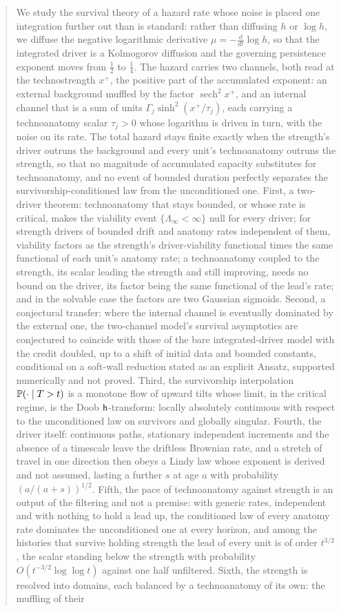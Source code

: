 \begin{abstract}
We study the survival theory of a hazard rate whose noise is placed one integration further out than is standard: rather than diffusing $h$ or $\log h$, we diffuse the negative logarithmic derivative $\mu=-\frac{d}{dt}\log h$, so that the integrated driver is a Kolmogorov diffusion and the governing persistence exponent moves from $\tfrac12$ to $\tfrac14$. The hazard carries two channels, both read at the technostrength $x^+$, the positive part of the accumulated exponent: an external background muffled by the factor $\operatorname{sech}^2x^+$, and an internal channel that is a sum of units $\Gamma_j\sinh^2(x^+/\tau_j)$, each carrying a technoanatomy scalar $\tau_j>0$ whose logarithm is driven in turn, with the noise on its rate. The total hazard stays finite exactly when the strength's driver outruns the background and every unit's technoanatomy outruns the strength, so that no magnitude of accumulated capacity substitutes for technoanatomy, and no event of bounded duration perfectly separates the survivorship-conditioned law from the unconditioned one. First, a two-driver theorem: technoanatomy that stays bounded, or whose rate is critical, makes the viability event $\{\Lambda_\infty<\infty\}$ null for every driver; for strength drivers of bounded drift and anatomy rates independent of them, viability factors as the strength's driver-viability functional times the same functional of each unit's anatomy rate; a technoanatomy coupled to the strength, its scalar leading the strength and still improving, needs no bound on the driver, its factor being the same functional of the lead's rate; and in the solvable case the factors are two Gaussian sigmoids. Second, a conjectural transfer: where the internal channel is eventually dominated by the external one, the two-channel model's survival asymptotics are conjectured to coincide with those of the bare integrated-driver model with the credit doubled, up to a shift of initial data and bounded constants, conditional on a soft-wall reduction stated as an explicit Ansatz, supported numerically and not proved. Third, the survivorship interpolation $\PP(\cdot\mid T>t)$ is a monotone flow of upward tilts whose limit, in the critical regime, is the Doob $\hm$-transform: locally absolutely continuous with respect to the unconditioned law on survivors and globally singular. Fourth, the driver itself: continuous paths, stationary independent increments and the absence of a timescale leave the driftless Brownian rate, and a stretch of travel in one direction then obeys a Lindy law whose exponent is derived and not assumed, lasting a further $s$ at age $a$ with probability $(a/(a+s))^{1/2}$. Fifth, the pace of technoanatomy against strength is an output of the filtering and not a premise: with generic rates, independent and with nothing to hold a lead up, the conditioned law of every anatomy rate dominates the unconditioned one at every horizon, and among the histories that survive holding strength the lead of every unit is of order $t^{3/2}$, the scalar standing below the strength with probability $O(t^{-3/2}\log\log t)$ against one half unfiltered. Sixth, the strength is resolved into domains, each balanced by a technoanatomy of its own: the muffling of their 
\end{abstract}
